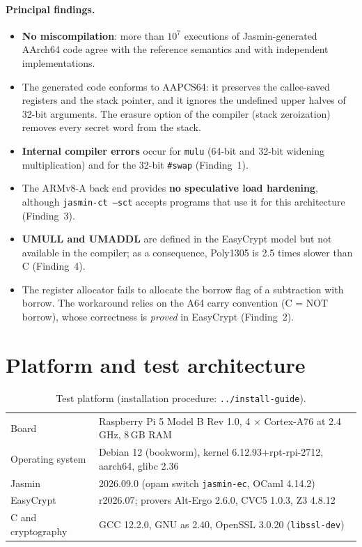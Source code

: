 \documentclass[11pt,a4paper]{article}
\newcommand{\file}[1]{\texttt{#1}}
\begin{document}
\paragraph{Principal findings.}
\begin{itemize}[leftmargin=*,itemsep=1pt]
  \item \textbf{No miscompilation}: more than $10^7$ executions of
        Jasmin-generated AArch64 code agree with the reference semantics
        and with independent implementations.
  \item The generated code conforms to AAPCS64: it preserves the
        callee-saved registers and the stack pointer, and it ignores the
        undefined upper halves of 32-bit arguments. The erasure option of
        the compiler (stack zeroization) removes every secret word from the
        stack.
  \item \textbf{Internal compiler errors} occur for \texttt{mulu} (64-bit
        and 32-bit widening multiplication) and for the 32-bit
        \texttt{\#swap} (Finding~1).
  \item The ARMv8-A back end provides \textbf{no speculative load
        hardening}, although \texttt{jasmin-ct --sct} accepts programs that
        use it for this architecture (Finding~3).
  \item \textbf{UMULL and UMADDL} are defined in the EasyCrypt model but not
        available in the compiler; as a consequence, Poly1305 is 2.5 times
        slower than C (Finding~4).
  \item The register allocator fails to allocate the borrow flag of a
        subtraction with borrow. The
        workaround relies on the A64 carry convention (C = NOT borrow),
        whose correctness is \emph{proved} in EasyCrypt (Finding~2).
\end{itemize}

\section{Platform and test architecture}

\begin{table}[h]
\centering\small
\begin{tabularx}{0.92\textwidth}{@{}lX@{}}
\toprule
Board & Raspberry Pi 5 Model B Rev 1.0, 4 $\times$ Cortex-A76 at 2.4\,GHz, 8\,GB RAM \\
Operating system & Debian 12 (bookworm), kernel 6.12.93+rpt-rpi-2712, aarch64, glibc 2.36 \\
Jasmin & 2026.09.0 (opam switch \texttt{jasmin-ec}, OCaml 4.14.2) \\
EasyCrypt & r2026.07; provers Alt-Ergo 2.6.0, CVC5 1.0.3, Z3 4.8.12 \\
C and cryptography & GCC 12.2.0, GNU as 2.40, OpenSSL 3.0.20 (\texttt{libssl-dev}) \\
\bottomrule
\end{tabularx}
\caption{Test platform (installation procedure: \file{../install-guide}).}
\end{table}
\end{document}
